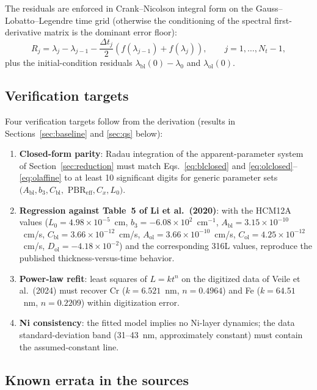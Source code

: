 The residuals are enforced in Crank--Nicolson integral form on the
Gauss--Lobatto--Legendre time grid (otherwise the conditioning of the spectral
first-derivative matrix is the dominant error floor):
\begin{equation}
R_j = \lambda_j - \lambda_{j-1}
- \frac{\Delta t_j}{2} \left( f(\lambda_{j-1}) + f(\lambda_j) \right) ,
\qquad j = 1, \ldots, N_t - 1 ,
\end{equation}
plus the initial-condition residuals $\lambda_{\mathrm{bl}}(0) - \lambda_0$
and $\lambda_{\mathrm{ol}}(0)$.

\subsection{Verification targets}
\label{sec:verification}
\label{sec:vtargets}

Four verification targets follow from the derivation (results in
Sections~\ref{sec:baseline} and \ref{sec:qs} below):
\begin{enumerate}
\item \textbf{Closed-form parity}: Radau integration of the apparent-parameter
system of Section~\ref{sec:reduction} must match
Eqs.~\eqref{eq:blclosed} and \eqref{eq:olclosed}--\eqref{eq:olaffine} to at
least 10 significant digits for generic parameter sets
$(A_{\mathrm{bl}}, b_3, C_{\mathrm{bl}},$
$\mathrm{PBR}_{\mathrm{eff}}, C_x, L_0)$.
\item \textbf{Regression against Table~5 of Li et al.\ (2020)}: with the HCM12A
values ($L_0 = 4.98 \times 10^{-5}$~cm, $b_3 = -6.08 \times 10^{2}$~cm$^{-1}$,
$A_{\mathrm{bl}} = 3.15 \times 10^{-10}$~cm/s,
$C_{\mathrm{bl}} = 3.66 \times 10^{-12}$~cm/s,
$A_{\mathrm{ol}} = 3.66 \times 10^{-10}$~cm/s,
$C_{\mathrm{ol}} = 4.25 \times 10^{-12}$~cm/s,
$D_{\mathrm{ol}} = -4.18 \times 10^{-2}$) and the corresponding 316L values,
reproduce the published thickness-versus-time behavior.
\item \textbf{Power-law refit}: least squares of $L = k t^n$ on the digitized
data of Veile et al.\ (2024) must recover Cr ($k = 6.521$~nm, $n = 0.4964$)
and Fe ($k = 64.51$~nm, $n = 0.2209$) within digitization error.
\item \textbf{Ni consistency}: the fitted model implies no Ni-layer dynamics;
the data standard-deviation band (31--43~nm, approximately constant) must
contain the assumed-constant line.
\end{enumerate}

\subsection{Known errata in the sources}
\label{sec:errata}

